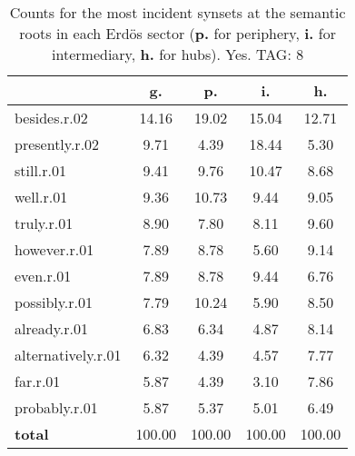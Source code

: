 \begin{table}[h!]
\begin{center}
\begin{tabular}{| l || c | c | c | c |}\hline
 & {\bf g.} & {\bf p.} & {\bf i.} & {\bf h.} \\\hline\hline
besides.r.02 & 14.16  & 19.02  & 15.04  & 12.71 \\\hline
presently.r.02 & 9.71  & 4.39  & 18.44  & 5.30 \\\hline
still.r.01 & 9.41  & 9.76  & 10.47  & 8.68 \\\hline
well.r.01 & 9.36  & 10.73  & 9.44  & 9.05 \\\hline
truly.r.01 & 8.90  & 7.80  & 8.11  & 9.60 \\\hline
however.r.01 & 7.89  & 8.78  & 5.60  & 9.14 \\\hline
even.r.01 & 7.89  & 8.78  & 9.44  & 6.76 \\\hline
possibly.r.01 & 7.79  & 10.24  & 5.90  & 8.50 \\\hline
already.r.01 & 6.83  & 6.34  & 4.87  & 8.14 \\\hline
alternatively.r.01 & 6.32  & 4.39  & 4.57  & 7.77 \\\hline
far.r.01 & 5.87  & 4.39  & 3.10  & 7.86 \\\hline
probably.r.01 & 5.87  & 5.37  & 5.01  & 6.49 \\\hline\hline
{{\bf total}} & 100.00  & 100.00  & 100.00  & 100.00 \\\hline
\end{tabular}
\caption{Counts for the most incident synsets at the semantic roots in each Erd\"os sector ({\bf p.} for periphery, {\bf i.} for intermediary, {\bf h.} for hubs). Yes. TAG: 8}
\end{center}
\end{table}